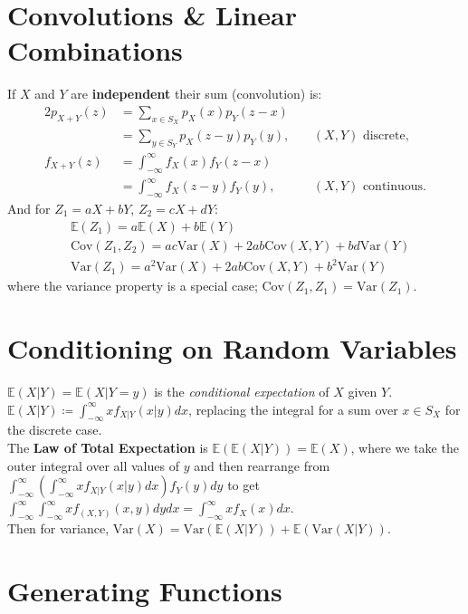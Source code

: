 \documentclass[titlepage,twocolumn]{article}
\begin{document}
\section*{Convolutions \& Linear Combinations}
If $X$ and $Y$ are \textbf{independent} their sum (convolution) is:
\begin{alignat*}{2}
    p_{X+Y}(z) &= \sum_{x \in S_X} p_X(x)p_Y(z-x)\\
               &= \sum_{y \in S_Y} p_X(z-y)p_Y(y), &&\ (X,Y) \mbox{ discrete,}\\
    f_{X+Y}(z) &= \int_{-\infty}^{\infty} f_X(x)f_Y(z-x)\\
               &= \int_{-\infty}^{\infty} f_X(z-y)f_Y(y), &&\ (X,Y) \mbox{ continuous.}
\end{alignat*}
And for $Z_1 = aX+bY$, $Z_2 = cX+dY$:
\begin{align*}
    &\mathbb{E}(Z_1) = a\mathbb{E}(X) + b\mathbb{E}(Y)\\
    &\mbox{Cov}(Z_1, Z_2) = ac \mbox{Var}(X) + 2ab \mbox{Cov}(X,Y) + bd \mbox{Var}(Y)\\
    &\mbox{Var}(Z_1) = a^2 \mbox{Var}(X) + 2ab \mbox{Cov}(X,Y) + b^2 \mbox{Var}(Y)
\end{align*}
where the variance property is a special case; $\mbox{Cov}(Z_1, Z_1) = \mbox{Var}(Z_1)$.

\section*{Conditioning on Random Variables}
$\mathbb{E}(X|Y) = \mathbb{E}(X|Y=y)$ is the \textit{conditional expectation} of $X$ given $Y$.\\[2mm]
$\mathbb{E}(X|Y) \coloneqq \int_{-\infty}^{\infty}x f_{X|Y}(x|y)dx$, replacing the integral for a sum over $x \in S_X$ for the discrete case.\\[2mm]
The \textbf{Law of Total Expectation} is $\mathbb{E}(\mathbb{E}(X|Y)) = \mathbb{E}(X)$, where we take the outer integral over all values of $y$ and then rearrange from $\int_{-\infty}^{\infty}(\int_{-\infty}^{\infty} x f_{X|Y}(x|y) dx) f_Y(y) dy$ to get $\int_{-\infty}^{\infty}\int_{-\infty}^{\infty} x f_{(X,Y)}(x,y) dy dx = \int_{-\infty}^{\infty} x f_X(x) dx$.\\[2mm]
Then for variance, $\mbox{Var}(X) = \mbox{Var}(\mathbb{E}(X|Y)) + \mathbb{E}(\mbox{Var}(X|Y))$.

\section*{Generating Functions}
\end{document}
